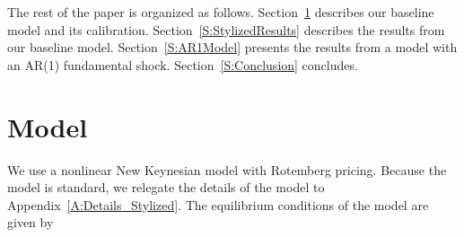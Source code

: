 \documentclass[11pt]{article}
\begin{document}
	The rest of the paper is organized as follows. Section~\ref{S:StylizedModel} describes our baseline model and its calibration. Section~\ref{S:StylizedResults} describes the results from our baseline model. Section~\ref{S:AR1Model} presents the results from a model with an AR(1) fundamental shock.  Section~\ref{S:Conclusion} concludes.
	
	
	
	\section{Model}
	\label{S:StylizedModel}
	
	We use a nonlinear New Keynesian model with Rotemberg pricing. Because the model is standard, we relegate the details of the model to Appendix~\ref{A:Details_Stylized}. The equilibrium conditions of the model are given by
	
\end{document}
